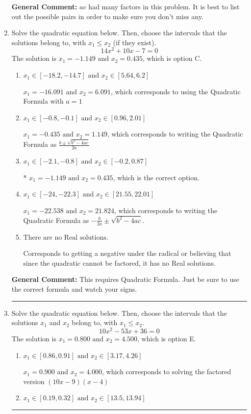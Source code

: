 \documentclass{extbook}[14pt]
\newcommand{\litem}[1]{\item #1

\rule{\textwidth}{0.4pt}}
\begin{document}
\begin{enumerate}
{\textbf{General Comment:} $ac$ had many factors in this problem. It is best to list out the possible pairs in order to make sure you don't miss any.
}
\litem{
Solve the quadratic equation below. Then, choose the intervals that the solutions belong to, with $x_1 \leq x_2$ (if they exist).
\[ 14x^{2} +10 x -7 = 0 \]
The solution is \( x_1 = -1.149 \text{ and } x_2 = 0.435 \), which is option C.\begin{enumerate}[label=\Alph*.]
\item \( x_1 \in [-18.2, -14.7] \text{ and } x_2 \in [5.64, 6.2] \)

 $x_1 = -16.091 \text{ and } x_2 = 6.091$, which corresponds to using the Quadratic Formula with $a=1$
\item \( x_1 \in [-0.8, -0.1] \text{ and } x_2 \in [0.96, 2.01] \)

 $x_1 = -0.435 \text{ and } x_2 = 1.149$, which corresponds to writing the Quadratic Formula as $\frac{b \pm \sqrt{b^2 - 4ac}}{2a}$
\item \( x_1 \in [-2.1, -0.8] \text{ and } x_2 \in [-0.2, 0.87] \)

* $x_1 = -1.149 \text{ and } x_2 = 0.435$, which is the correct option.
\item \( x_1 \in [-24, -22.3] \text{ and } x_2 \in [21.55, 22.01] \)

 $x_1 = -22.538 \text{ and } x_2 = 21.824$, which corresponds to writing the Quadratic Formula as $-\frac{b}{2a} \pm \sqrt{b^2 - 4ac}$.
\item \( \text{There are no Real solutions.} \)

Corresponds to getting a negative under the radical or believing that since the quadratic cannot be factored, it has no Real solutions.
\end{enumerate}

\textbf{General Comment:} This requires Quadratic Formula. Just be sure to use the correct formula and watch your signs.
}
\litem{
Solve the quadratic equation below. Then, choose the intervals that the solutions $x_1$ and $x_2$ belong to, with $x_1 \leq x_2$.
\[ 10x^{2} -53 x + 36 = 0 \]
The solution is \( x_1 = 0.800 \text{ and } x_2 = 4.500 \), which is option E.\begin{enumerate}[label=\Alph*.]
\item \( x_1 \in [0.86, 0.91] \text{ and } x_2 \in [3.17, 4.26] \)

$x_1 = 0.900 \text{ and } x_2 = 4.000$, which corresponds to solving the factored version $(10x -9)(x -4)$
\item \( x_1 \in [0.19, 0.32] \text{ and } x_2 \in [13.5, 13.94] \)


\end{enumerate}}
\end{enumerate}
\end{document}
